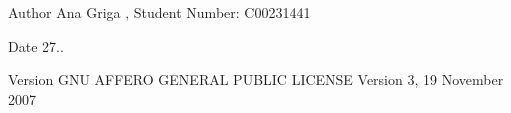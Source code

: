 \begin{DoxyAuthor}{Author}
Ana Griga , Student Number\+: C00231441 
\end{DoxyAuthor}
\begin{DoxyDate}{Date}
27.. 
\end{DoxyDate}
\begin{DoxyVersion}{Version}
G\+NU A\+F\+F\+E\+RO G\+E\+N\+E\+R\+AL P\+U\+B\+L\+IC L\+I\+C\+E\+N\+SE Version 3, 19 November 2007 
\end{DoxyVersion}
